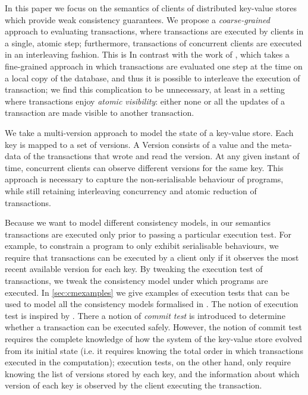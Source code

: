In this paper we focus on the semantics of clients of distributed key-value 
stores which provide weak consistency guarantees. 
We propose a \emph{coarse-grained} approach to evaluating transactions, 
where transactions are executed by clients in a single, atomic step; furthermore, 
transactions of concurrent clients are executed in an interleaving fashion.
This is In contrast with the work of \cite{alonetogether}, which 
takes a fine-grained approach in which transactions are evaluated one step 
at the time on a local copy of the database, and thus it is possible 
to interleave the execution of transaction; we find this complication to be 
unnecessary, at least in a setting where transactions enjoy \emph{atomic 
visibility}: either none or all the updates of a transaction are made 
visible to another transaction. 

We take a multi-version approach to model the state of a key-value store. 
Each key is mapped to a set of versions. A Version consists of a 
value and the meta-data of the transactions that wrote and read the version. 
At any given instant of time, concurrent clients can observe different versions for the same key.
This approach is necessary to capture the non-serialisable behaviour of 
programs, while still retaining interleaving concurrency and atomic reduction 
of transactions. 

Because we want to model different consistency models, in our semantics 
transactions are executed only prior to passing a particular execution test. For example, 
to constrain a program to only exhibit serialisable behaviours, we require that 
transactions can be executed by a client only if it observes the most 
recent available version for each key. By tweaking the execution test 
of transactions, we tweak the consistency model under which programs 
are executed. In \ref{sec:cmexamples} we give examples of execution tests 
that can be used to model all the consistency models formalised in \cite{framework-concur}.
The notion of execution test is inspired by \cite{seebelieve}. There a notion of \emph{commit test} is introduced 
to determine whether a transaction can be executed safely. However, 
the notion of commit test requires the complete knowledge of 
how the system of the key-value store evolved from its 
initial state (i.e. it requires knowing the total order in which transactions executed in 
the computation); execution tests, on the other hand, only require
knowing the list of versions stored by each key, and the 
information about which version of each key is observed 
by the client executing the transaction.

